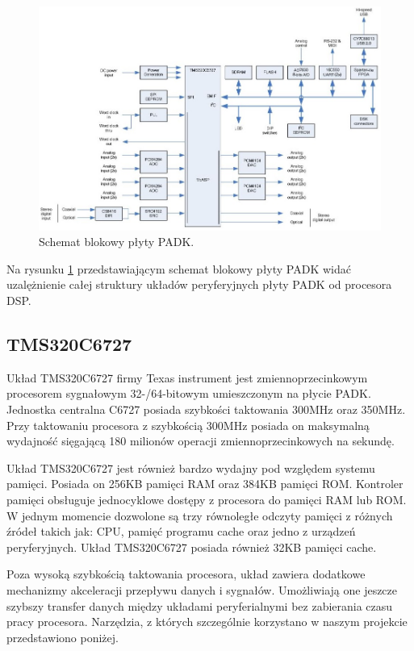 \begin{figure}[H]
	\centering
	\includegraphics[width=16cm]{./grafiki/real_PADK_block}
	\captionsetup{justification=centering}
	\caption{Schemat blokowy płyty PADK.}
	\label{rys:real_padk}
\end{figure}

Na rysunku \ref{rys:real_padk} przedstawiającym schemat blokowy płyty PADK widać uzalężnienie całej struktury układów peryferyjnych płyty PADK od procesora DSP.

\subsection{TMS320C6727}
Układ TMS320C6727 firmy Texas instrument jest zmiennoprzecinkowym procesorem sygnałowym 32-/64-bitowym umieszczonym na płycie PADK. Jednostka centralna C6727 posiada szybkości taktowania 300MHz oraz 350MHz. Przy taktowaniu procesora z szybkością 300MHz posiada on maksymalną wydajność sięgającą 180 milionów operacji zmiennoprzecinkowych na sekundę.

Układ TMS320C6727 jest również bardzo wydajny pod względem systemu pamięci. Posiada on 256KB pamięci RAM oraz 384KB pamięci ROM. Kontroler pamięci obsługuje jednocyklowe dostępy z procesora do pamięci  RAM lub ROM. W jednym momencie dozwolone są trzy równoległe odczyty pamięci z różnych źródeł takich jak: CPU, pamięć programu cache oraz jedno z urządzeń peryferyjnych. Układ TMS320C6727 posiada również 32KB pamięci cache.

Poza wysoką szybkością taktowania procesora, układ zawiera dodatkowe mechanizmy akceleracji przepływu danych i sygnałów. Umożliwiają one jeszcze szybszy transfer danych między układami peryferialnymi bez zabierania czasu pracy procesora. Narzędzia, z których szczególnie korzystano w naszym projekcie przedstawiono poniżej.

